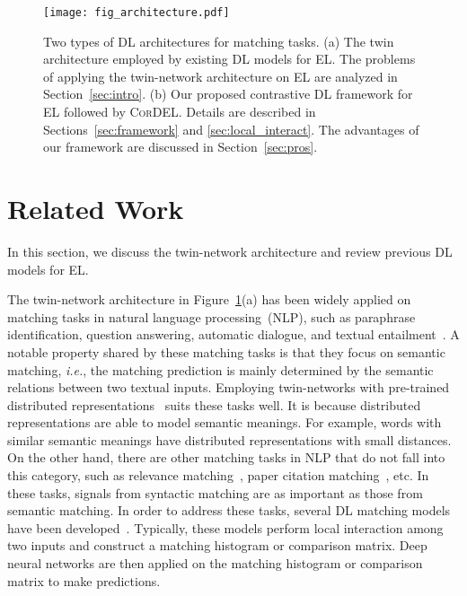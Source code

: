 \documentclass[conference]{IEEEtran}
\begin{document}
\begin{figure}
	\centering
	\texttt{[image: fig\_architecture.pdf]}
	\caption{Two types of DL architectures for matching tasks. (a) The twin architecture employed by existing DL models for EL. The problems of applying the twin-network architecture on EL are analyzed in Section~\ref{sec:intro}. (b) Our proposed contrastive DL framework for EL followed by \textsc{CorDEL}. Details are described in Sections~\ref{sec:framework} and \ref{sec:local_interact}. The advantages of our framework are discussed in Section~\ref{sec:pros}.}
	\label{fig:architecture}
\end{figure}





\section{Related Work}














In this section, we discuss the twin-network architecture and review previous DL models for EL.

The twin-network architecture in Figure~\ref{fig:architecture}(a) has been widely applied on matching tasks in natural language processing~(NLP), such as paraphrase identification, question answering, automatic dialogue, and textual entailment~\cite{huang2013learning,gao2014modeling,shen2014learning,hu2014convolutional}. A notable property shared by these matching tasks is that they focus on semantic matching, \textit{i.e.}, the matching prediction is mainly determined by the semantic relations between two textual inputs. Employing twin-networks with pre-trained distributed representations~\cite{mikolov2013distributed,pennington2014glove,bojanowski2017enriching,joulin2017bag} suits these tasks well. It is because distributed representations are able to model semantic meanings. For example, words with similar semantic meanings have distributed representations with small distances. On the other hand, there are other matching tasks in NLP that do not fall into this category, such as relevance matching~\cite{guo2016deep}, paper citation matching~\cite{pang2016text}, etc. In these tasks, signals from syntactic matching are as important as those from semantic matching. In order to address these tasks, several DL matching models have been developed~\cite{lu2013deep,guo2016deep,pang2016text}. Typically, these models perform local interaction among two inputs and construct a matching histogram or comparison matrix. Deep neural networks are then applied on the matching histogram or comparison matrix to make predictions.
\end{document}
